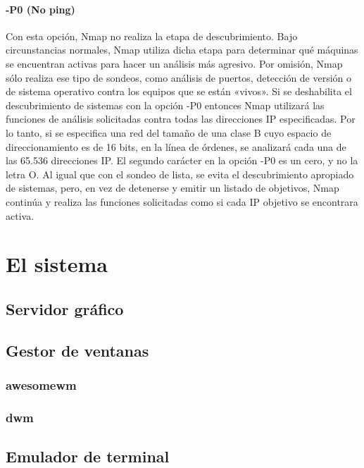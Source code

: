 \documentclass[a4paper, 11pt, titlepage]{book}
\begin{document}
            \subsubsection{\textbf{-P0 (No ping)}} Con esta opción, Nmap no realiza la etapa de descubrimiento. 
            Bajo circunstancias normales, Nmap utiliza dicha etapa para determinar qué máquinas se encuentran 
            activas para hacer un análisis más agresivo. Por omisión, Nmap sólo realiza ese tipo de sondeos, 
            como análisis de puertos, detección de versión o de sistema operativo contra los equipos que se 
            están «vivos». Si se deshabilita el descubrimiento de sistemas con la opción -P0 entonces Nmap 
            utilizará las funciones de análisis solicitadas contra todas las direcciones IP especificadas. 
            Por lo tanto, si se especifica una red del tamaño de una clase B cuyo espacio de direccionamiento 
            es de 16 bits, en la línea de órdenes, se analizará cada una de las 65.536 direcciones IP. El 
            segundo carácter en la opción -P0 es un cero, y no la letra O. Al igual que con el sondeo de lista, 
            se evita el descubrimiento apropiado de sistemas, pero, en vez de detenerse y emitir un listado de 
            objetivos, Nmap continúa y realiza las funciones solicitadas como si cada IP objetivo se encontrara 
            activa.


\chapter{El sistema}

    \section{Servidor gráfico}

    \section{Gestor de ventanas}

        \subsection{awesomewm}

        \subsection{dwm}

    \section{Emulador de terminal}
\end{document}
